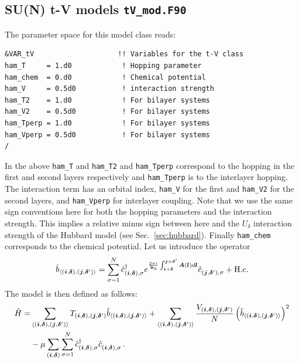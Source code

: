 \subsection{SU(N)  t-V models  \texttt{tV\_mod.F90}}


The parameter space for this model class  reads: 

\begin{lstlisting}[style=fortran,escapechar=\#,breaklines=true]
&VAR_tV                    !! Variables for the t-V class
ham_T     = 1.d0            ! Hopping parameter
ham_chem  = 0.d0            ! Chemical potential
ham_V     = 0.5d0           ! interaction strength
ham_T2    = 1.d0            ! For bilayer systems
ham_V2    = 0.5d0           ! For bilayer systems
ham_Tperp = 1.d0            ! For bilayer systems
ham_Vperp = 0.5d0           ! For bilayer systems
/

\end{lstlisting}
In the above   \texttt{ham\_T} and \texttt{ham\_T2} and \texttt{ham\_Tperp}   correspond to the hopping in the first and second layers respectively and  \texttt{ham\_Tperp}   is to the interlayer hopping.   The interaction term has an orbital index, 
\texttt{ham\_V}  for the first and  \texttt{ham\_V2}  for the second layers,  and \texttt{ham\_Vperp} for interlayer coupling. Note that we use the same sign conventions here for both the hopping parameters and the interaction strength. This implies a relative minus sign between here and the $U_\delta$ interaction strength of the Hubbard model (see Sec.~\ref{sec:hubbard}).
Finally   \texttt{ham\_chem}  corresponds to the chemical potential. Let us introduce the operator
\begin{equation}
\hat{b}_{\langle (\boldsymbol{i},\boldsymbol{\delta}), (\boldsymbol{j},\boldsymbol{\delta}') \rangle} =  \sum_{\sigma =1}^{N}    \hat{c}^{\dagger}_{(\boldsymbol{i},\boldsymbol{\delta}), \sigma }   e^{\frac{2 \pi i}{\Phi_0} \int_{\boldsymbol{i} + \boldsymbol{\delta}}^{\boldsymbol{j} + \boldsymbol{\delta}'}  
	\boldsymbol{A}(\boldsymbol{l})  d \boldsymbol{l}} \hat{c}^{}_{(\boldsymbol{j},\boldsymbol{\delta}'),\sigma} 
+ \mathrm{H.c.}
\end{equation}
The model is then defined as follows:
\begin{align}
\hat{H}= & \sum_{\langle (\ve{i},\ve{\delta}), (\ve{j},\ve{\delta}') \rangle}   T_{(\ve{i},\ve{\delta}), (\ve{j},\ve{\delta}')}    \hat{b}_{\langle (\ve{i},\ve{\delta}), (\ve{j},\ve{\delta}') \rangle}
+ \sum_{\langle (\ve{i},\ve{\delta}), (\ve{j},\ve{\delta}') \rangle}  \frac{V_{(\ve{i},\ve{\delta}), (\ve{j},\ve{\delta}')}}{N} \left(  \hat{b}_{\langle (\ve{i},\ve{\delta}), (\ve{j},\ve{\delta}') \rangle}  \right)^2  \nonumber \\
& - \mu \sum_{(\ve{i},\ve{\delta})}  \sum_{\sigma =1}^{N} \hat{c}^{\dagger}_{(\vec{i},\ve{\delta}),\sigma } \hat{c}^{\phantom\dagger}_{(\vec{i},\ve{\delta}),\sigma } \,.
\end{align}
